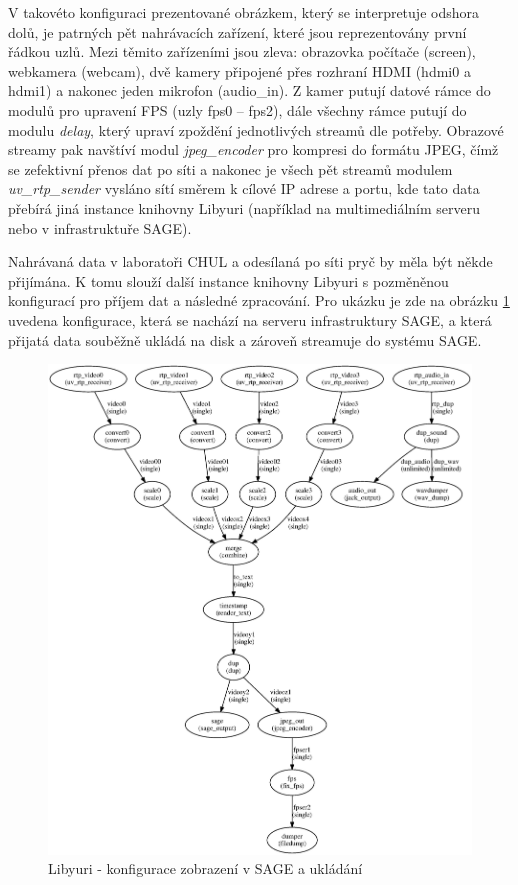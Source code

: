 \documentclass[thesis=M,czech]{FITthesis}[2012/06/26]
\begin{document}
V takovéto konfiguraci prezentované obrázkem, který se interpretuje odshora dolů, je patrných pět nahrávacích zařízení, které jsou reprezentovány první řádkou uzlů. Mezi těmito zařízeními jsou zleva: obrazovka počítače (screen), webkamera (webcam), dvě kamery připojené přes rozhraní HDMI (hdmi0 a hdmi1) a nakonec jeden mikrofon (audio\_in). Z kamer putují datové rámce do modulů pro upravení FPS (uzly fps0 -- fps2), dále všechny rámce putují do modulu \textit{delay}, který upraví zpoždění jednotlivých streamů dle potřeby. Obrazové streamy pak navštíví modul \textit{jpeg\_encoder} pro kompresi do formátu JPEG, čímž se zefektivní přenos dat po síti a nakonec je všech pět streamů modulem \textit{uv\_rtp\_sender} vysláno sítí směrem k cílové IP adrese a portu, kde tato data přebírá jiná instance knihovny Libyuri (například na multimediálním serveru nebo v infrastruktuře SAGE). 

Nahrávaná data v laboratoři CHUL a odesílaná po síti pryč by měla být někde přijímána. K tomu slouží další instance knihovny Libyuri s pozměněnou konfigurací pro příjem dat a následné zpracování. Pro ukázku je zde na obrázku \ref{img:navrh_backend_libyuri_receiver} uvedena konfigurace, která se nachází na serveru infrastruktury SAGE, a která přijatá data souběžně ukládá na disk a zároveň streamuje do systému SAGE.
\\
\begin{figure}[h]\centering
	\includegraphics[width=1\textwidth]{images/ulab_receiver.eps}
	\caption{Libyuri - konfigurace zobrazení v SAGE a ukládání}\label{img:navrh_backend_libyuri_receiver}
\end{figure}
\end{document}
